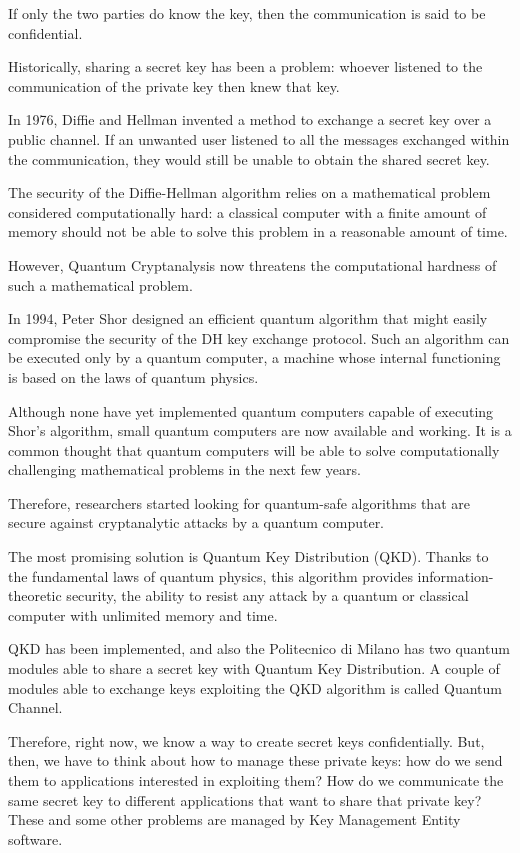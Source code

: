 \documentclass{Configuration_Files/PoliMi3i_thesis}
\begin{document}
If only the two parties do know the key, then the communication is said to be confidential.

Historically, sharing a secret key has been a problem: whoever listened to the communication of the private key then knew that key.

In 1976, Diffie and Hellman invented a method to exchange a secret key over a public channel. If an unwanted user listened to all the messages exchanged within the communication, they would still be unable to obtain the shared secret key.

The security of the Diffie-Hellman algorithm relies on a mathematical problem considered computationally hard: a classical computer with a finite amount of memory should not be able to solve this problem in a reasonable amount of time.

However, Quantum Cryptanalysis now threatens the computational hardness of such a mathematical problem.

In 1994, Peter Shor designed an efficient quantum algorithm that might easily compromise the security of the DH key exchange protocol.
Such an algorithm can be executed only by a quantum computer, a machine whose internal functioning is based on the laws of quantum physics.

Although none have yet implemented quantum computers capable of executing Shor's algorithm, small quantum computers are now available and working. It is a common thought that quantum computers will be able to solve computationally challenging mathematical problems in the next few years.

Therefore, researchers started looking for quantum-safe algorithms that are secure against cryptanalytic attacks by a quantum computer.

The most promising solution is Quantum Key Distribution (QKD). Thanks to the fundamental laws of quantum physics, this algorithm provides information-theoretic security, the ability to resist any attack by a quantum or classical computer with unlimited memory and time.

QKD has been implemented, and also the Politecnico di Milano has two quantum modules able to share a secret key with Quantum Key Distribution. A couple of modules able to exchange keys exploiting the QKD algorithm is called Quantum Channel.

Therefore, right now, we know a way to create secret keys confidentially. But, then, we have to think about how to manage these private keys: how do we send them to applications interested in exploiting them? How do we communicate the same secret key to different applications that want to share that private key? These and some other problems are managed by Key Management Entity software.
\end{document}
